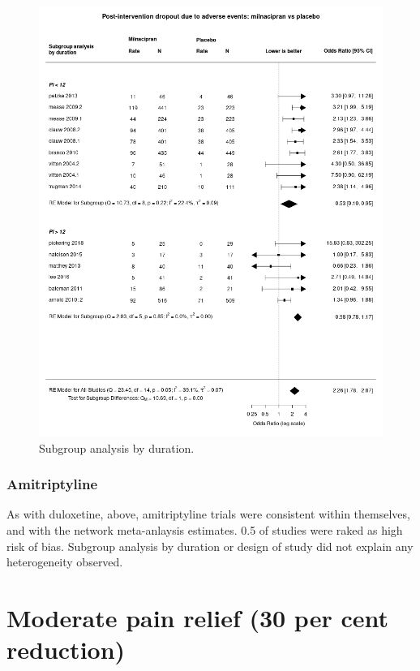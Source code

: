 \documentclass{report}\usepackage[]{graphicx}\usepackage[]{color}
\begin{document}
\begin{figure}
\includegraphics[width = \textwidth]{img/adverse_dropout-duration-milnacipran-placebo-forest.png}
\caption[Dropout by duration, milnacipran]{
Subgroup analysis by duration.
}
\label{fig:dropout-duration-milna-plac}
\end{figure}

\subsubsection{Amitriptyline}

As with duloxetine, above, amitriptyline trials were consistent within themselves, and with the network meta-anlaysis estimates. 0.5 of studies were raked as high risk of bias. Subgroup analysis by duration or design of study did not explain any heterogeneity observed.


\section{Moderate pain relief (30 per cent reduction)}
\end{document}
